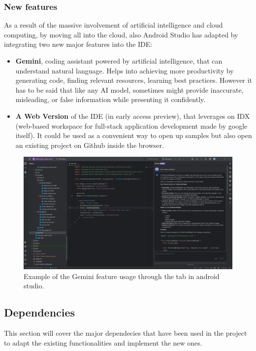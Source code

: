 \subsubsection{New features}

As a result of the massive involvement of artificial intelligence and cloud computing, by moving all into the cloud, also Android Studio has adapted by integrating two new major features into the IDE\cite{AndroidStudioNewFeatures}:

\begin{itemize}[nosep] %
    \item \textbf{Gemini}, coding assistant powered by artificial intelligence, that can understand natural language. Helps into achieving more productivity by generating code, finding relevant resources, learning best practices. However it has to be said that like any AI model, sometimes might provide inaccurate, misleading, or false information while presenting it confidently.
    \item \textbf{A Web Version} of the IDE (in early access preview), that leverages on IDX (web-based workspace for full-stack application development made by google itself). It could be used as a convenient way to open up samples but also open an existing project on Github inside the browser.
\end{itemize}

\begin{figure}
    \includegraphics[width=1.0\linewidth]{./images/gemini.png}
    \caption{Example of the Gemini feature usage through the tab in android studio.}
\end{figure}
\newpage
\subsection{Dependencies}
This section will cover the major dependecies that have been used in the project to adapt the existing functionalities and implement the new ones.

